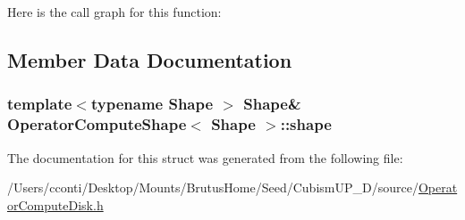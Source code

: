 Here is the call graph for this function\+:




\subsection{Member Data Documentation}
\hypertarget{struct_operator_compute_shape_a03556ff9f531396746e5bc7008f31bae}{}
\subsubsection[{shape}]{\setlength{\rightskip}{0pt plus 5cm}template$<$typename Shape $>$ {\bf Shape}\& {\bf Operator\+Compute\+Shape}$<$ {\bf Shape} $>$\+::shape}\label{struct_operator_compute_shape_a03556ff9f531396746e5bc7008f31bae}


The documentation for this struct was generated from the following file\+:\begin{DoxyCompactItemize}
\item 
/\+Users/cconti/\+Desktop/\+Mounts/\+Brutus\+Home/\+Seed/\+Cubism\+U\+P\+\_\+D/source/\hyperlink{_operator_compute_disk_8h}{Operator\+Compute\+Disk.\+h}\end{DoxyCompactItemize}
